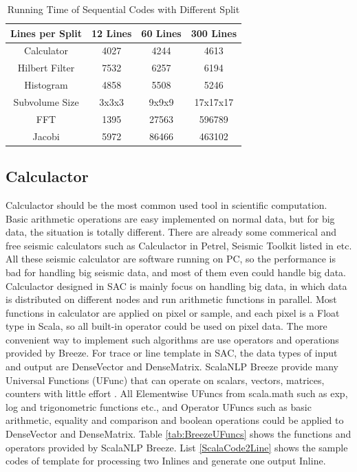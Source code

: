 \begin{table}[H]
\caption{Running Time of Sequential Codes with Different Split}
\centering
\begin{tabular}{||c| c c c ||} 
 \hline
 Lines per Split & 12 Lines & 60 Lines & 300 Lines \\ [0.5ex] 
 \hline
 Calculator & 4027 & 4244 & 4613 \\ 
 Hilbert Filter & 7532 & 6257 & 6194 \\
 Histogram & 4858 & 5508 & 5246 \\
 \hline
 \hline
 Subvolume Size & 3x3x3 & 9x9x9 & 17x17x17 \\ [0.5ex] 
 \hline
 FFT & 1395 & 27563 & 596789 \\
 Jacobi & 5972 & 86466 & 463102 \\
 \hline
\end{tabular}
\label{table:CalcSpark}
\end{table}


\subsection{Calculactor}
Calculactor should be the most common used tool in scientific computation. Basic arithmetic operations are easy implemented on normal data, but for big data, the situation is totally different. There are already some commerical and free seismic calculators such as Calculactor in Petrel, Seismic Toolkit listed in \cite{SeismicCalculator} etc. All these seismic calculator are software running on PC, so the performance is bad for handling big seismic data, and most of them even could handle big data. Calculactor designed in SAC is mainly focus on handling big data, in which data is distributed on different nodes and run arithmetic functions in parallel. Most functions in calculator are applied on pixel or sample, and each pixel is a Float type in Scala, so all built-in operator could be used on pixel data. The more convenient way to implement such algorithms are use operators and operations provided by Breeze. For trace or line template in SAC, the data types of input and output are DenseVector and DenseMatrix. ScalaNLP Breeze provide many Universal Functions (UFunc) that can operate on scalars, vectors, matrices, counters with little effort \cite{BreezeUFunc}. All Elementwise UFuncs from scala.math such as exp, log and trigonometric functions etc., and Operator UFuncs such as basic arithmetic, equality and comparison and boolean operations could be applied to DenseVector and DenseMatrix. Table \ref{tab:BreezeUFuncs} shows the functions and operators provided by ScalaNLP Breeze. List \ref{ScalaCode2Line} shows the sample codes of template for processing two Inlines and generate one output Inline.  

